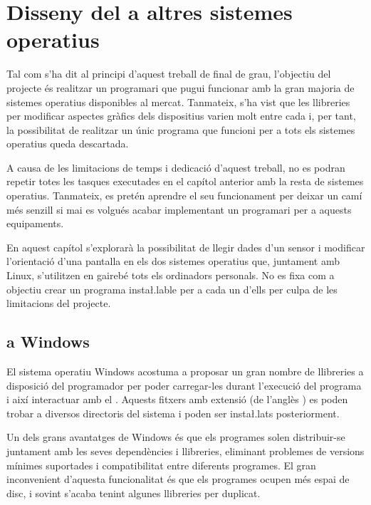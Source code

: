 \chapter{Disseny del  a altres sistemes operatius}
\label{cap:software-other}

Tal com s'ha dit al principi d'aquest treball de final de grau, l'objectiu
del projecte és realitzar un programari que pugui funcionar amb la gran majoria
de sistemes operatius disponibles al mercat. Tanmateix, s'ha vist que les
llibreries per modificar aspectes gràfics dels dispositius varien molt entre
cada  i, per tant, la possibilitat de realitzar un únic programa que
funcioni per a tots els sistemes operatius queda descartada.

A causa de les limitacions de temps i dedicació d'aquest treball, no es podran
repetir totes les tasques executades en el capítol anterior amb la resta
de sistemes operatius. Tanmateix, es pretén aprendre el seu funcionament
per deixar un camí més senzill si mai es volgués acabar implementant un
programari per a aquests equipaments.

En aquest capítol s'explorarà la possibilitat de llegir dades d'un sensor
 i modificar l'orientació d'una pantalla en els dos sistemes operatius
que, juntament amb Linux, s'utilitzen en gairebé tots els ordinadors personals.
No es fixa com a objectiu crear un programa insta\l.lable per a cada un d'ells
per culpa de les limitacions del projecte.

\section{ a Windows}

El sistema operatiu Windows acostuma a proposar un gran nombre de llibreries
a disposició del programador per poder carregar-les durant l'execució del
programa i així interactuar amb el . Aquests fitxers amb
extensió  (de l'anglès ) es poden trobar
a diversos directoris del sistema i poden ser insta\l.lats posteriorment.

Un dels grans avantatges de Windows és que els programes solen distribuir-se
juntament amb les seves dependències i llibreries, eliminant problemes de
versions mínimes suportades i compatibilitat entre diferents programes. El
gran inconvenient d'aquesta funcionalitat és que els programes ocupen més espai
de disc, i sovint s'acaba tenint algunes llibreries per duplicat.

